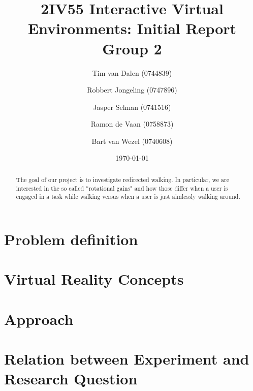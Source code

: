 \documentclass[a4paper,11pt]{article}
\title{
	2IV55 Interactive Virtual Environments: Initial Report Group 2
}
\author{
	Tim van Dalen (0744839)
	\and
	Robbert Jongeling (0747896)
	\and
	Jasper Selman (0741516)
	\and
	Ramon de Vaan (0758873)
	\and
	Bart van Wezel (0740608)
}
\date{\today}
\begin{document}
	\maketitle
	
	\begin{abstract}
		The goal of our project is to investigate redirected walking. 
		In particular, we are interested in the so called ``rotational gains" and how those differ when a user is engaged in a task while walking versus when a user is just aimlessly walking around.
	\end{abstract}
	
	\section{Problem definition}
	\label{sec:problem}
	
	
	\section{Virtual Reality Concepts}
	\label{sec:vr}
	
	
	\section{Approach}
	\label{sec:approach}
	
	\section{Relation between Experiment and Research Question}
	\label{sec:rel}
	
	
\end{document}
